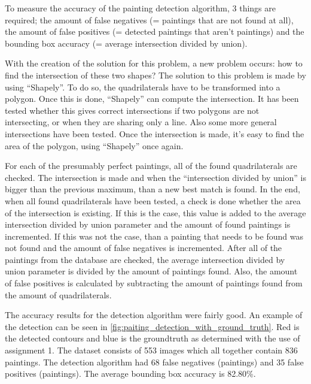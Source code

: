 To measure the accuracy of the painting detection algorithm, 3 things are required; the amount of false negatives (= paintings that are not found at all), the amount of false positives (= detected paintings that aren't paintings) and the bounding box accuracy (= average intersection divided by union).

With the creation of the solution for this problem, a new problem occurs: how to find the intersection of these two shapes? The solution to this problem is made by using ``Shapely''. To do so, the quadrilaterals have to be transformed into a polygon. Once this is done, ``Shapely'' can compute the intersection. It has been tested whether this gives correct intersections if two polygons are not intersecting, or when they are sharing only a line. Also some more general intersections have been tested. Once the intersection is made, it's easy to find the area of the polygon, using ``Shapely'' once again.

For each of the presumably perfect paintings, all of the found quadrilaterals are checked. The intersection is made and when the ``intersection divided by union'' is bigger than the previous maximum, than a new best match is found. In the end, when all found quadrilaterals have been tested, a check is done whether the area of the intersection is existing. If this is the case, this value is added to the average intersection divided by union parameter and the amount of found paintings is incremented. If this was not the case, than a painting that needs to be found was not found and the amount of false negatives is incremented. After all of the paintings from the database are checked, the average intersection divided by union parameter is divided by the amount of paintings found. Also, the amount of false positives is calculated by subtracting the amount of paintings found from the amount of quadrilaterals.

The accuracy results for the detection algorithm were fairly good. An example of the detection can be seen in \ref{fig:paiting_detection_with_ground_truth}. Red is the detected contours and blue is the groundtruth as determined with the use of assignment 1. The dataset consists of 553 images which all together contain 836 paintings. The detection algorithm had 68 false negatives (paintings) and 35 false positives (paintings). The average bounding box accuracy is 82.80\%.

